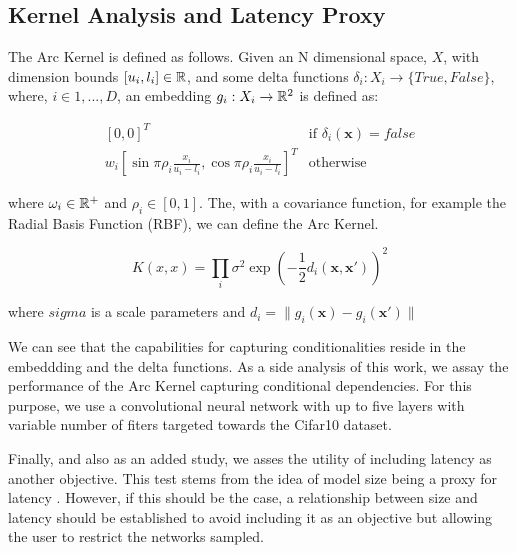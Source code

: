 \documentclass[a4paper, twocolumn]{article}
\begin{document}
\subsection{Kernel Analysis and Latency Proxy}\label{analysis}

The Arc Kernel \cite{Swersky2014} is defined as follows. Given an N dimensional space, $X$, with dimension bounds $[u_{i}, l_{i}] \in \Bbb{R}$, and some delta functions $ \delta_{i}: X_{i} \rightarrow \{True, False\}$, where, $i \in {1,...,D}$, an embedding $g_{i}: X_{i}\rightarrow \Bbb{R}^{2}$ is defined as:

\[
\begin{array}{ll}
[0, 0]^{T}& \mbox{if $\delta_{i}(\mathbf{x}) = false$} \\
 w_{i}[\sin{\pi\rho_{i}\frac{x_{i}}{u_{i}-l_{i}}},\cos{\pi\rho_{i}\frac{x_{i}}{u_{i}-l_{i}}}]^{T} & \mbox{otherwise}
 \end{array} 
\]

where $\omega_{i}\in\Bbb{R}^{+}$ and $\rho_{i}\in[0, 1]$. The, with a covariance function, for example the Radial Basis Function (RBF), we can define the Arc Kernel.


\begin{equation}
K(x, x) =  \prod_{i}\sigma^{2}\exp(-\frac{1}{2}d_{i}(\mathbf{x}, \mathbf{x'}))^{2}
\end{equation}

where $sigma$ is a scale parameters and $d_{i}=\|g_{i}(\mathbf{x})-g_{i}(\mathbf{x'})\|$

We can see that the capabilities for capturing conditionalities reside in the embeddding and the delta functions. As a side analysis of this work, we assay the performance of the Arc Kernel capturing conditional dependencies. For this purpose, we use a convolutional neural network with up to five layers with variable number of fiters targeted towards the Cifar10 dataset.

Finally, and also as an added study, we asses the utility of including latency as another objective. This test stems from the idea of model size being a proxy for latency \cite{Loni2020}. However, if this should be the case, a relationship between size and latency should be established to avoid including it as an objective but allowing the user to restrict the networks sampled.
\end{document}
